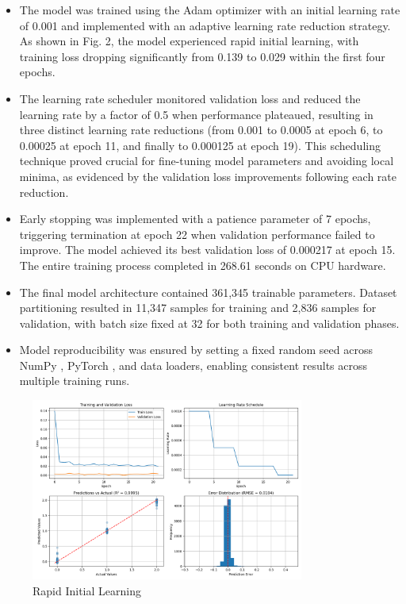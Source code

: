 \documentclass[3p,times,procedia]{elsarticle}
\begin{document}
\begin{itemize}
    \item The model was trained using the Adam optimizer \cite{Kingma2015} with an initial learning rate of 0.001 and implemented with an adaptive learning rate reduction strategy. As shown in Fig. 2, the model experienced rapid initial learning, with training loss dropping significantly from 0.139 to 0.029 within the first four epochs.
\item The learning rate scheduler monitored validation loss and reduced the learning rate by a factor of 0.5 when performance plateaued, resulting in three distinct learning rate reductions (from 0.001 to 0.0005 at epoch 6, to 0.00025 at epoch 11, and finally to 0.000125 at epoch 19). This scheduling technique proved crucial for fine-tuning model parameters and avoiding local minima, as evidenced by the validation loss improvements following each rate reduction.
\item Early stopping was implemented with a patience parameter of 7 epochs, triggering termination at epoch 22 when validation performance failed to improve. The model achieved its best validation loss of 0.000217 at epoch 15. The entire training process completed in 268.61 seconds on CPU hardware.
\item The final model architecture contained 361,345 trainable parameters. Dataset partitioning resulted in 11,347 samples for training and 2,836 samples for validation, with batch size fixed at 32 for both training and validation phases.
\item Model reproducibility was ensured by setting a fixed random seed across NumPy \cite{Harris2020}, PyTorch \cite{Paszke2019}, and data loaders, enabling consistent results across multiple training runs.
\end{itemize}
\begin{figure}[!ht] %
    \centering
    \includegraphics[width=0.80\textwidth]{Picture2.png} %

    \caption{Rapid Initial Learning}
    \label{fig:learning_curve}
\end{figure}
\end{document}
